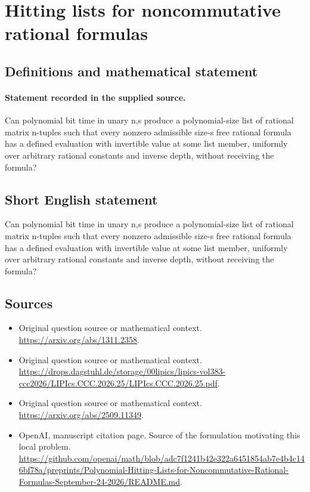 \documentclass[11pt]{article}
\begin{document}
\section*{Hitting lists for noncommutative rational formulas}\label{30007468}
\subsection{Definitions and mathematical statement}
\paragraph{Statement recorded in the supplied source.}
Can polynomial bit time in unary n,s produce a polynomial-size list of rational matrix n-tuples such that every nonzero admissible size-s free rational formula has a defined evaluation with invertible value at some list member, uniformly over arbitrary rational constants and inverse depth, without receiving the formula?
\subsection{Short English statement}
Can polynomial bit time in unary n,s produce a polynomial-size list of rational matrix n-tuples such that every nonzero admissible size-s free rational formula has a defined evaluation with invertible value at some list member, uniformly over arbitrary rational constants and inverse depth, without receiving the formula?
\subsection{Sources}
\begin{itemize}
\item[S1] Original question source or mathematical context.
\url{https://arxiv.org/abs/1311.2358}.
\item[S2] Original question source or mathematical context.
\url{https://drops.dagstuhl.de/storage/00lipics/lipics-vol383-ccc2026/LIPIcs.CCC.2026.25/LIPIcs.CCC.2026.25.pdf}.
\item[S3] Original question source or mathematical context.
\url{https://arxiv.org/abs/2509.11349}.
\item[S4] OpenAI, manuscript citation page. Source of the formulation motivating this local problem.
\url{https://github.com/openai/math/blob/adc7f1241b42e322a6451854ab7e4b4c146bf78a/preprints/Polynomial-Hitting-Lists-for-Noncommutative-Rational-Formulas-September-24-2026/README.md}.
\end{itemize}
\end{document}
